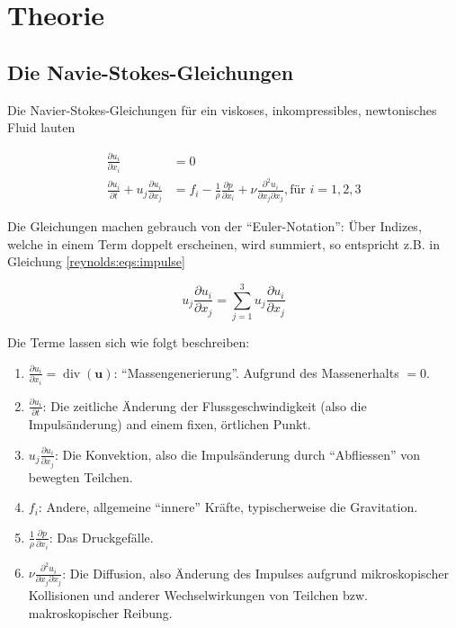 %
%
%
%
\section{Theorie\label{reynolds:section:teil0}}
\subsection{Die Navie-Stokes-Gleichungen}
Die Navier-Stokes-Gleichungen für ein viskoses, inkompressibles, newtonisches Fluid lauten

\begin{align}
    \label{reynolds:eqs:mass}
    \frac{\partial u_i}{\partial x_i} &= 0 \\
    \label{reynolds:eqs:impulse}
    \frac{\partial u_i}{\partial t} + u_j \frac{\partial u_i}{\partial x_j} &=
        f_i - \frac{1}{\rho} \frac{\partial p}{\partial x_i} + 
        \nu \frac{\partial^2 u_i}{\partial x_j \partial x_j}, \text{für $i = 1,2,3$}
\end{align}

Die Gleichungen machen gebrauch von der ``Euler-Notation'': Über Indizes, welche in einem Term doppelt
erscheinen, wird summiert, so entspricht z.B. in Gleichung \ref{reynolds:eqs:impulse}

\begin{equation}
u_j \frac{\partial u_i}{\partial x_j} = \sum_{j=1}^{3} u_j \frac{\partial u_i}{\partial x_j}
\end{equation}

Die Terme lassen sich wie folgt beschreiben:

\begin{enumerate}
    \item $\frac{\partial u_i}{\partial x_i} = \operatorname{div}(\mathbf{u})$: ``Massengenerierung''.
    Aufgrund des Massenerhalts $ = 0$.
    \item $\frac{\partial u_i}{\partial t}$: Die zeitliche Änderung der Flussgeschwindigkeit (also die 
        Impulsänderung) and einem fixen, örtlichen Punkt.
    \item $u_j \frac{\partial u_i}{\partial x_j}$: Die Konvektion, also die Impulsänderung durch ``Abfliessen''
        von bewegten Teilchen.
    \item $f_i$: Andere, allgemeine ``innere'' Kräfte, typischerweise die Gravitation.
    \item $\frac{1}{\rho} \frac{\partial p}{\partial x_i}$: Das Druckgefälle.
    \item $\nu \frac{\partial^2 u_i}{\partial x_j \partial x_j}$: Die Diffusion, also Änderung des Impulses
        aufgrund mikroskopischer Kollisionen und anderer Wechselwirkungen von Teilchen bzw.
        makroskopischer Reibung.
\end{enumerate}


